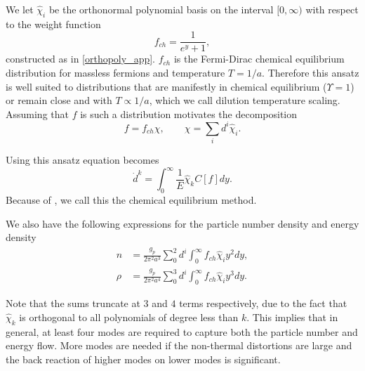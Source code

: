 We let $\hat\chi_i$ be the orthonormal polynomial basis on the interval $[0,\infty)$ with respect to the weight function
\begin{equation}\label{free_stream_weight}
f_{ch}=\frac{1}{e^y+1},
\end{equation}
constructed as in  \ref{orthopoly_app}. $f_{ch}$ is the Fermi-Dirac chemical equilibrium distribution for massless fermions and temperature $T=1/a$.  Therefore this ansatz is well suited to distributions that are manifestly in chemical equilibrium ($\Upsilon=1$) or remain close and with $T\propto 1/a$, which we call dilution temperature scaling.  Assuming that $f$ is such a distribution  motivates the decomposition
\begin{equation}\label{free_stream_ansatz}
f=f_{ch}\chi,\qquad \chi=\sum_i d^i\hat\chi_i.
\end{equation}

Using this ansatz  equation  becomes
\begin{equation}
\dot{d}^k=\int_0^\infty\frac{1}{E}\hat{\chi}_k C[f]dy.
\end{equation}
Because of , we call this the chemical equilibrium method.

We also have the following expressions for the particle number density and energy density
\begin{align}\label{free_stream_moments}
n&=\frac{g_p}{2\pi^2 a^3}\sum_0^2 d^i\int_0^\infty f_{ch}\hat\chi_i y^2dy,\\
\rho&=\frac{g_p}{2\pi^2a^4}\sum_0^3 d^i\int_0^\infty f_{ch}\hat\chi_i y^3dy.
\end{align}

Note that the sums truncate at $3$ and $4$ terms respectively, due to the fact that $\hat\chi_k$ is orthogonal to all polynomials of degree less than $k$. This implies that in general, at least four modes are required to capture both the particle number and energy flow. More modes are needed if the non-thermal distortions are large and the back reaction of higher modes on lower modes is significant.

